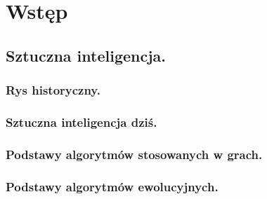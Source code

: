 \section{Wstęp}
\subsection{Sztuczna inteligencja.}
\subsubsection{Rys historyczny.}

\subsubsection{Sztuczna inteligencja dziś.}

\subsubsection{Podstawy algorytmów stosowanych w grach.}

\subsubsection{Podstawy algorytmów ewolucyjnych.}




